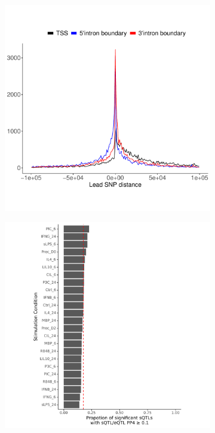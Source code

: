 \begin{figure}[H]
  \centering
  \begin{subfigure}[b]{0.45\textwidth}
      \centering
      \includegraphics[width=\textwidth]{intron_tss}
      \caption{}
      \label{fig:intron_tss}
  \end{subfigure}
  \hfill
  \begin{subfigure}[b]{0.45\textwidth}
      \centering
      \includegraphics[width=\textwidth]{esqtl}
      \caption{}
      \label{fig:esqtl}
  \end{subfigure}



\end{figure}
